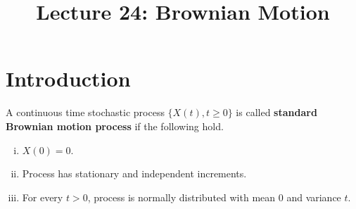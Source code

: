 \documentclass[a4paper,10pt,english]{article}
\title{Lecture 24: Brownian Motion}
\author{}
\begin{document}
\maketitle
\section{Introduction}
\begin{defn} A continuous time stochastic process $\{X(t), t \geqslant 0\}$ is called \textbf{standard Brownian motion process} if the following hold.
\begin{enumerate}[i)]
\item $X(0) = 0$.
\item Process has stationary and independent increments.
\item For every $t > 0$, process is normally distributed with mean $0$ and variance $t$.
\end{enumerate}
\end{defn}
\end{document}
